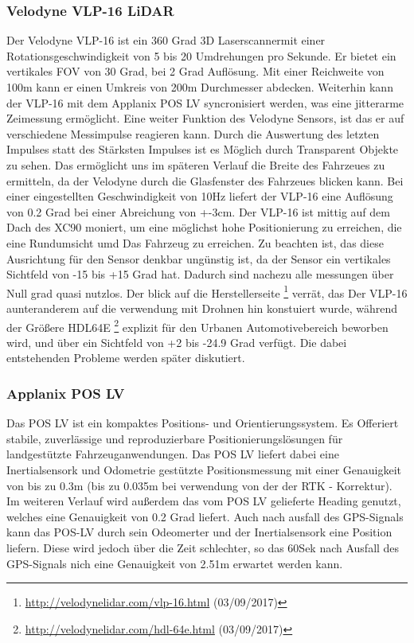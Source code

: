 \subsubsection{Velodyne VLP-16 LiDAR}
Der Velodyne VLP-16 ist ein 360 Grad 3D Laserscannermit einer Rotationsgeschwindigkeit von 5 bis 20 Umdrehungen pro Sekunde. Er bietet ein vertikales FOV von 30 Grad, bei 2 Grad Auflösung.
Mit einer Reichweite von 100m kann er einen Umkreis von 200m Durchmesser abdecken. Weiterhin kann der VLP-16 mit dem Applanix POS LV syncronisiert werden, was eine jitterarme Zeimessung ermöglicht.
Eine weiter Funktion des Velodyne Sensors, ist das er auf verschiedene Messimpulse reagieren kann. Durch die Auswertung des letzten Impulses statt des Stärksten Impulses ist es Möglich durch Transparent Objekte zu sehen.
Das ermöglicht uns im späteren Verlauf die Breite des Fahrzeues zu ermitteln, da der Velodyne durch die Glasfenster des Fahrzeues blicken kann.
Bei einer eingestellten Geschwindigkeit von 10Hz liefert der VLP-16 eine Auflösung von 0.2 Grad bei einer Abreichung von +-3cm. Der VLP-16 ist mittig auf dem Dach des XC90 moniert, um eine möglichst hohe Positionierung
zu erreichen, die eine Rundumsicht umd Das Fahrzeug zu erreichen. Zu beachten ist, das diese Ausrichtung für den Sensor denkbar ungünstig ist, da der Sensor ein vertikales
Sichtfeld von -15 bis +15 Grad hat. Dadurch sind nachezu alle messungen über Null grad quasi nutzlos. Der blick auf die Herstellerseite
\footnote{\url{http://velodynelidar.com/vlp-16.html} (03/09/2017)}
verrät, das Der VLP-16 aunteranderem auf die verwendung mit Drohnen hin konstuiert wurde, während der Größere HDL64E
\footnote{\url{http://velodynelidar.com/hdl-64e.html} (03/09/2017)}
explizit für den Urbanen Automotivebereich beworben wird, und über ein Sichtfeld von +2 bis -24.9 Grad verfügt. Die dabei entstehenden Probleme werden später diskutiert.



\subsubsection{Applanix POS LV}
Das POS LV ist ein kompaktes Positions- und Orientierungssystem. Es Offeriert stabile, zuverlässige und reproduzierbare Positionierungslösungen für landgestützte Fahrzeuganwendungen.
Das POS LV liefert dabei eine Inertialsensork und Odometrie gestützte Positionsmessung mit einer Genauigkeit von bis zu 0.3m (bis zu 0.035m bei verwendung von der der RTK - Korrektur).
Im weiteren Verlauf wird außerdem das vom POS LV gelieferte Heading genutzt, welches eine Genauigkeit von 0.2 Grad liefert. Auch nach ausfall des GPS-Signals kann das POS-LV durch sein
Odeomerter und der Inertialsensork eine Position liefern. Diese wird jedoch über die Zeit schlechter, so das 60Sek nach Ausfall des GPS-Signals nich eine Genauigkeit von 2.51m erwartet
werden kann.\cite{manAP}


